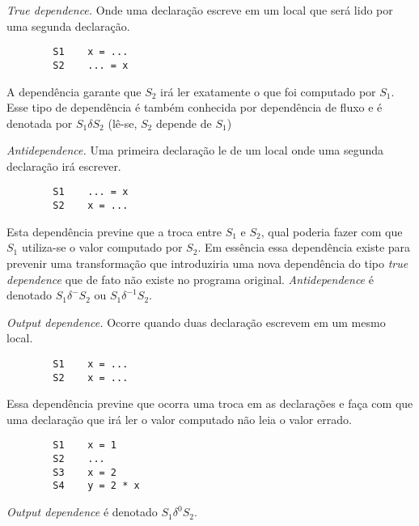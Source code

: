 \begin{alineas}
        \item \textit{True dependence.} Onde uma declaração escreve em um local
        que será lido por uma segunda declaração.
        \begin{verbatim}
        S1    x = ...
        S2    ... = x
        \end{verbatim}
        A dependência garante que $S_2$ irá ler exatamente o que foi computado
        por $S_1$. Esse tipo de dependência é também conhecida por dependência de
        fluxo e é denotada por $S_1 \delta S_2$ (lê-se, $S_2$ depende de $S_1$)

        \item \textit{Antidependence.} Uma primeira declaração le de um local
        onde uma segunda declaração irá escrever.
        \begin{verbatim}
        S1    ... = x
        S2    x = ...
        \end{verbatim}
        Esta dependência previne que a troca entre $S_1$ e $S_2$, qual poderia
        fazer com que $S_1$ utiliza-se o valor computado por $S_2$. Em essência
        essa dependência existe para prevenir uma transformação que introduziria
        uma nova dependência do tipo \textit{true dependence} que de fato não
        existe no programa original. \textit{Antidependence} é denotado $S_1
        \delta^- S_2$ ou $S_1 \delta^{-1} S_2$.

        \item \textit{Output dependence.} Ocorre quando duas declaração escrevem
        em um mesmo local.
        \begin{verbatim}
        S1    x = ...
        S2    x = ...
        \end{verbatim}
        Essa dependência previne que ocorra uma troca em as declarações e faça com
        que uma declaração que irá ler o valor computado não leia o valor
        errado.
        \begin{verbatim}
        S1    x = 1
        S2    ...
        S3    x = 2 
        S4    y = 2 * x
        \end{verbatim}
        \textit{Output dependence} é denotado $S_1 \delta^0 S_2$.
\end{alineas}






